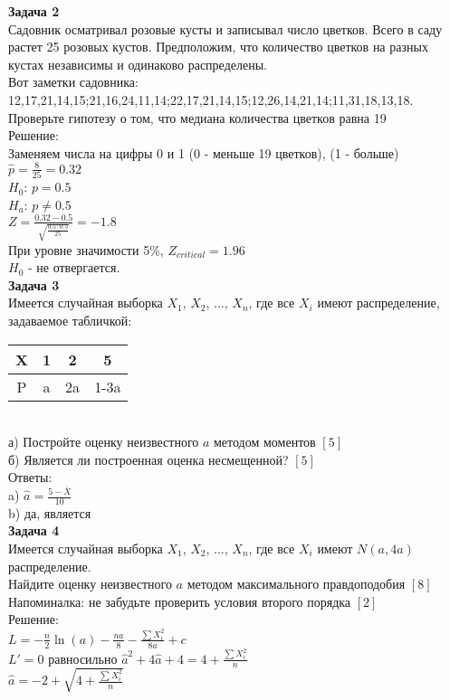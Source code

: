 \documentclass[pdftex,12pt,a4paper]{article}
\begin{document}
\textbf{Задача 2} \\ %
Садовник осматривал розовые кусты и записывал число цветков. Всего в саду растет 25 розовых кустов. Предположим, что количество цветков на разных кустах независимы и одинаково распределены. \\
Вот заметки садовника: \\
12,17,21,14,15;21,16,24,11,14;22,17,21,14,15;12,26,14,21,14;11,31,18,13,18.\\
Проверьте гипотезу о том, что медиана количества цветков равна 19\\
Решение: \\
Заменяем числа на цифры 0 и 1 (0 - меньше 19 цветков), (1 - больше) \\
$\hat{p}=\frac{8}{25}=0.32$ \\
$H_{0}$: $p=0.5$ \\
$H_{a}$: $p\neq 0.5$ \\
$Z=\frac{0.32-0.5}{\sqrt{\frac{0.5\cdot 0.5}{25}}}=-1.8$ \\
При уровне значимости 5\%, $Z_{critical}=1.96$ \\
$H_{0}$ - не отвергается. \\

\textbf{Задача 3} \\ %
Имеется случайная выборка $X_{1}$, $X_{2}$, ..., $X_{n}$, где все $X_{i}$ имеют распределение, задаваемое табличкой: \\
\begin{tabular}{|c|c|c|c|}
\hline 
X & 1 & 2 & 5 \\ 
\hline 
P & a & 2a & 1-3a \\ 
\hline 
\end{tabular} \\
а) Постройте оценку неизвестного $a$ методом моментов $[5]$ \\
б) Является ли построенная оценка несмещенной? $[5]$ \\
Ответы: \\
a) $\hat{a}=\frac{5-\bar{X}}{10}$ \\
b) да, является \\


\textbf{Задача 4} \\ %
Имеется случайная выборка $X_{1}$, $X_{2}$, ..., $X_{n}$, где все $X_{i}$ имеют $N(a,4a)$ распределение. \\
Найдите оценку неизвестного $a$ методом максимального правдоподобия $[8]$  \\
Напоминалка: не забудьте проверить условия второго порядка $[2]$ \\
Решение: \\
$L=-\frac{n}{2}\ln(a)-\frac{na}{8}-\frac{\sum X_{i}^{2}}{8a}+c$ \\
$L'=0$ равносильно $\hat{a}^{2}+4\hat{a}+4=4+\frac{\sum X_{i}^{2}}{n}$ \\
$\hat{a}=-2+\sqrt{4+\frac{\sum X_{i}^{2}}{n}}$ \\
\end{document}
